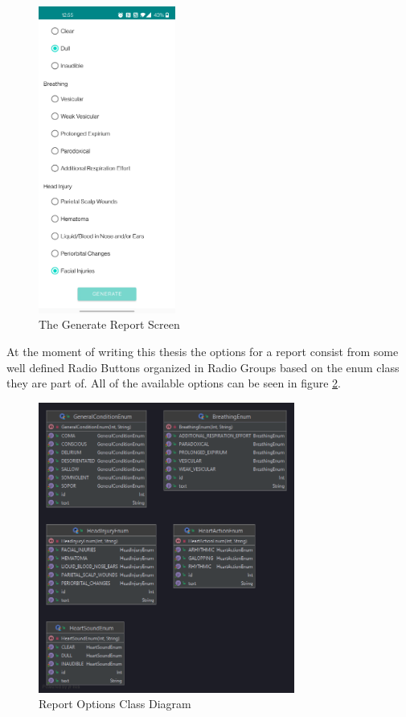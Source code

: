 \begin{figure}
\centering
\includegraphics[width=0.4\textwidth]{figures/generate_report_screen.png}
\caption{The Generate Report Screen}
\label{fig:generate-report-screen}
\end{figure}

At the moment of writing this thesis the options for a report consist from some well defined Radio Buttons organized in Radio Groups based on the enum class they are part of. All of the available options can be seen in figure \ref{fig:report-options-diagram}.

\begin{figure}
\centering
\includegraphics[width=0.75\textwidth]{figures/report_options_class_diagram.png}
\caption{Report Options Class Diagram}
\label{fig:report-options-diagram}
\end{figure}
